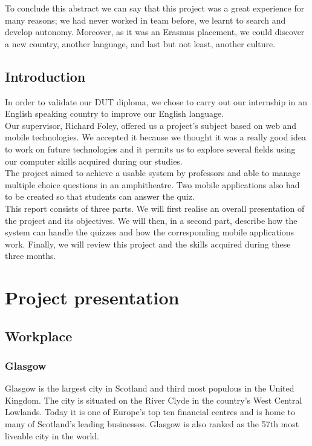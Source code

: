 \documentclass{scrreprt}
\begin{document}
To conclude this abstract we can say that this project was a great experience for many
reasons; we had never worked in team before, we learnt to search and develop
autonomy. Moreover, as it was an Erasmus placement, we could discover a new country,
another language, and last but not least, another culture.

\chapter*{Introduction} %
In order to validate our DUT diploma, we chose to carry out our internship in an
English speaking country to improve our English language.\\

Our supervisor, Richard Foley, offered us a project's subject based on web and mobile
technologies. We accepted it because we thought it was a really good idea to work on future
technologies and it permits us to explore several fields using our computer skills acquired
during our studies.\\

The project aimed to achieve a usable system by professors and able to manage
multiple choice questions in an amphitheatre. Two mobile applications also had to be
created so that students can answer the quiz.\\

This report consists of three parts. We will first realise an overall presentation of the
project and its objectives. We will then, in a second part, describe how the system can
handle the quizzes and how the corresponding mobile applications work. Finally, we will
review this project and the skills acquired during these three months.

\renewcommand{\contentsname}{Summary}
\tableofcontents

\part{Project presentation}
\chapter{Workplace}
\section{Glasgow}%
Glasgow is the largest city in Scotland and third most populous in the United
Kingdom. The city is situated on the River Clyde in the country's West Central Lowlands.
Today it is one of Europe's top ten financial centres and is home to many of
Scotland's leading businesses. Glasgow is also ranked as the 57th most liveable city in the
world.\\
\end{document}

